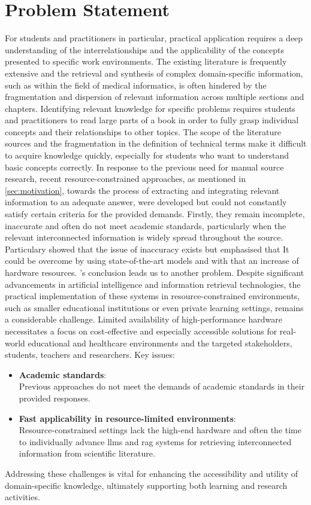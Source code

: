 \section{Problem Statement}\label{sec:problem statement}
For students and practitioners in particular, practical application requires a deep understanding of the interrelationships and the applicability of the concepts presented to specific work environments.
The existing literature is frequently extensive and the retrieval and synthesis of complex domain-specific information, such as within the field of medical informatics, is often hindered by the fragmentation and dispersion of relevant information across multiple sections and chapters.
Identifying relevant knowledge for specific problems requires students and practitioners to read large parts of a book in order to fully grasp individual concepts and their relationships to other topics.
The scope of the literature sources and the fragmentation in the definition of technical terms make it difficult to acquire knowledge quickly, especially for students who want to understand basic concepts correctly.
%
In response to the previous need for manual source research, recent resource-constrained approaches, as mentioned in \cref{sec:motivation}, towards the process of extracting and integrating relevant information to an adequate answer, were developed but could not constantly satisfy certain criteria for the provided demands. 
Firstly, they remain incomplete, inaccurate and often do not meet academic standards, particularly when the relevant interconnected information is widely spread throughout the source.
%
Particulary \citet{Paul_Keller} showed that the issue of inaccuracy exists but emphasised that It could be overcome by using state-of-the-art models and with that an increase of hardware resources. 
\citet{Paul_Keller}'s conclusion leads us to another problem.   
Despite significant advancements in artificial intelligence and information retrieval technologies, the practical implementation of these systems in resource-constrained environments, such as smaller educational institutions or even private learning settings, remains a considerable challenge. 
Limited availability of high-performance hardware necessitates a focus on cost-effective and especially accessible solutions for real-world educational and healthcare environments and the targeted stakeholders, students, teachers and researchers.
%
Key issues:
\begin{itemize}
    \item \textbf{Academic standards}:\\
    Previous approaches do not meet the demands of academic standards in their provided responses. 
    \item \textbf{Fast applicability in resource-limited environments}:\\ 
    Resource-constrained settings lack the high-end hardware and often the time to individually advance \ac{llm}s and \ac{rag} systems for retrieving interconnected information from scientific literature.
\end{itemize}
%
Addressing these challenges is vital for enhancing the accessibility and utility of domain-specific knowledge, ultimately supporting both learning and research activities. 

